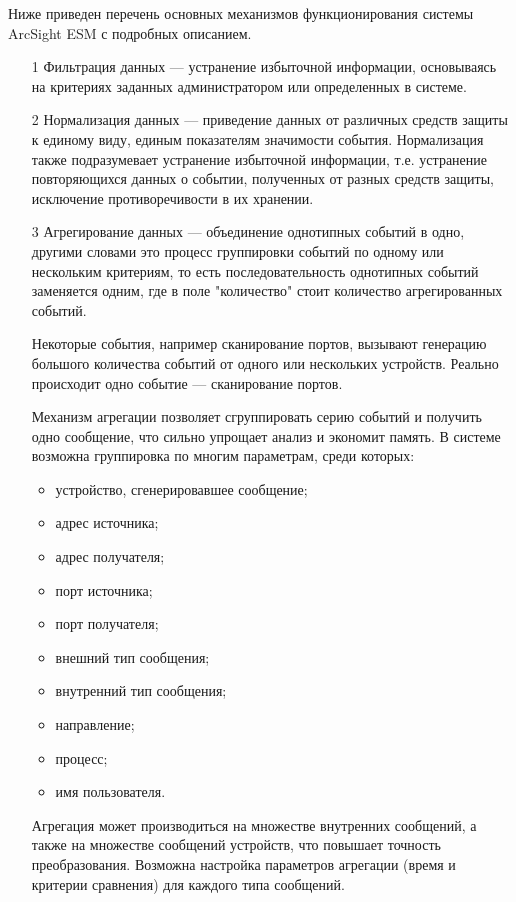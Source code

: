 Ниже приведен перечень основных механизмов функционирования системы ArcSight ESM с подробных описанием.
\begin{enumerate}
    \item [1] Фильтрация данных --- устранение избыточной информации, основываясь на критериях заданных администратором или определенных в системе.
    \item[2] Нормализация данных --- приведение данных от различных средств защиты к единому виду, единым показателям значимости события. Нормализация также подразумевает устранение избыточной информации, т.е. устранение повторяющихся данных о событии, полученных от разных средств защиты, исключение противоречивости в их хранении.
    \item[3] Агрегирование данных --- объединение однотипных событий в одно, другими словами это процесс группировки событий по одному или нескольким критериям, то есть последовательность однотипных событий заменяется одним, где в поле "количество" стоит количество агрегированных событий.
    
    Некоторые события, например сканирование портов, вызывают генерацию большого количества событий от одного или нескольких устройств. Реально происходит одно событие --- сканирование портов.
    
    Механизм агрегации позволяет сгруппировать серию событий и получить одно сообщение, что сильно упрощает анализ и экономит память. В системе возможна группировка по многим параметрам, среди которых:
    \begin{itemize}
        \item устройство, сгенерировавшее сообщение;
        \item адрес источника;
        \item адрес получателя;
        \item порт источника;
        \item порт получателя;
        \item внешний тип сообщения;
        \item внутренний тип сообщения;
        \item направление;
        \item процесс;
        \item имя пользователя.
    \end{itemize}
    
Агрегация может производиться на множестве внутренних сообщений, а также на множестве сообщений устройств, что повышает точность преобразования. Возможна настройка параметров агрегации (время и критерии сравнения) для каждого типа сообщений.


\end{enumerate}

